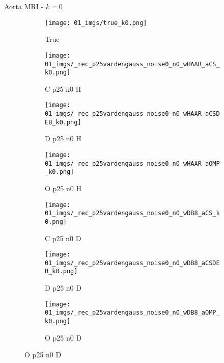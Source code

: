 \begin{frame}{Aorta MRI - $k=0$}{}
\begin{figure}
\begin{subfigure}{0.13\textwidth}
\texttt{[image: 01\_imgs/true\_k0.png]}
\caption*{\tiny True}
\end{subfigure}
\begin{subfigure}{0.13\textwidth}
\texttt{[image: 01\_imgs/\_rec\_p25vardengauss\_noise0\_n0\_wHAAR\_aCS\_k0.png]}
\caption*{\tiny C p25 n0 H}
\end{subfigure}
\begin{subfigure}{0.13\textwidth}
\texttt{[image: 01\_imgs/\_rec\_p25vardengauss\_noise0\_n0\_wHAAR\_aCSDEB\_k0.png]}
\caption*{\tiny D p25 n0 H}
\end{subfigure}
\begin{subfigure}{0.13\textwidth}
\texttt{[image: 01\_imgs/\_rec\_p25vardengauss\_noise0\_n0\_wHAAR\_aOMP\_k0.png]}
\caption*{\tiny O p25 n0 H}
\end{subfigure}
\begin{subfigure}{0.13\textwidth}
\texttt{[image: 01\_imgs/\_rec\_p25vardengauss\_noise0\_n0\_wDB8\_aCS\_k0.png]}
\caption*{\tiny C p25 n0 D}
\end{subfigure}
\begin{subfigure}{0.13\textwidth}
\texttt{[image: 01\_imgs/\_rec\_p25vardengauss\_noise0\_n0\_wDB8\_aCSDEB\_k0.png]}
\caption*{\tiny D p25 n0 D}
\end{subfigure}
\begin{subfigure}{0.13\textwidth}
\texttt{[image: 01\_imgs/\_rec\_p25vardengauss\_noise0\_n0\_wDB8\_aOMP\_k0.png]}
\caption*{\tiny O p25 n0 D}
\end{subfigure}

\vspace{5pt}


\end{figure}
\end{frame}
